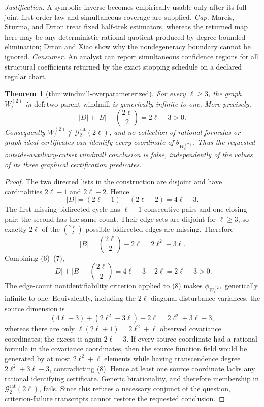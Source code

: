 \documentclass{article}
\newtheorem{theorem}{Theorem}
\begin{document}
\par\smallskip\noindent \textit{Justification.} A symbolic inverse becomes empirically usable only after its full joint first-order law and simultaneous coverage are supplied. \textit{Gap.} Mareis, Sturma, and Drton treat fixed half-trek estimators, whereas the returned map here may be any deterministic rational quotient produced by degree-bounded elimination; Drton and Xiao show why the nondegeneracy boundary cannot be ignored. \textit{Consumer.} An analyst can report simultaneous confidence regions for all structural coefficients returned by the exact stopping schedule on a declared regular chart.

\begin{theorem}[thm:windmill-overparameterized]\label{thm:windmill-overparameterized}
For every \(\ell\geq3\), the graph \(W_{\ell}^{(2)}\) in \(\mathrm{def:two\mbox{-}parent\mbox{-}windmill}\) is generically infinite-to-one.  More precisely,
\[
 |D|+|B|-\binom{2\ell}{2}=2\ell-3>0.
\]
Consequently \(W_{\ell}^{(2)}\notin\mathcal G_{2}^{\mathrm{rat}}(2\ell)\), and no collection of rational formulas or graph-ideal certificates can identify every coordinate of \(\theta_{W_{\ell}^{(2)}}\).  Thus the requested outside-auxiliary-cutset windmill conclusion is false, independently of the values of its three graphical certification predicates.
\end{theorem}
\begin{proof}
The two directed lists in the construction are disjoint and have cardinalities \(2\ell-1\) and \(2\ell-2\).  Hence
\[
 |D|=(2\ell-1)+(2\ell-2)=4\ell-3. \tag{6}
\]
The first missing-bidirected cycle has \(\ell-1\) consecutive pairs and one closing pair; the second has the same count.  Their edge sets are disjoint for \(\ell\geq3\), so exactly \(2\ell\) of the \(\binom{2\ell}{2}\) possible bidirected edges are missing.  Therefore
\[
 |B|=\binom{2\ell}{2}-2\ell=2\ell^2-3\ell. \tag{7}
\]
Combining (6)--(7),
\[
 |D|+|B|-\binom{2\ell}{2}
 =4\ell-3-2\ell=2\ell-3>0. \tag{8}
\]
The edge-count nonidentifiability criterion applied to (8) makes \(\phi_{W_{\ell}^{(2)}}\) generically infinite-to-one.  Equivalently, including the \(2\ell\) diagonal disturbance variances, the source dimension is
\[
 (4\ell-3)+(2\ell^2-3\ell)+2\ell=2\ell^2+3\ell-3,
\]
whereas there are only \(\ell(2\ell+1)=2\ell^2+\ell\) observed covariance coordinates; the excess is again \(2\ell-3\).  If every source coordinate had a rational formula in the covariance coordinates, then the source function field would be generated by at most \(2\ell^2+\ell\) elements while having transcendence degree \(2\ell^2+3\ell-3\), contradicting (8).  Hence at least one source coordinate lacks any rational identifying certificate.  Generic birationality, and therefore membership in \(\mathcal G_{2}^{\mathrm{rat}}(2\ell)\), fails.  Since this refutes a necessary conjunct of the question, criterion-failure transcripts cannot restore the requested conclusion.
\end{proof}
\end{document}

